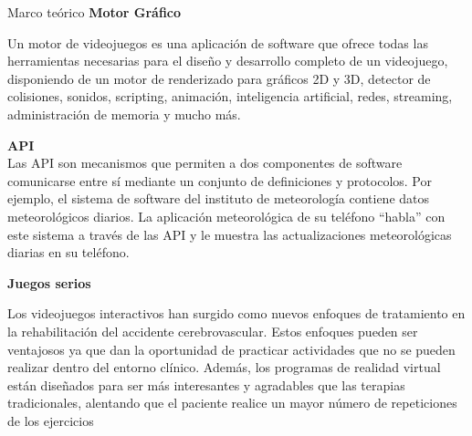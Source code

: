 \begin{thesischapter}{1} {Marco teórico}
    \vspace{10pt}
    \textbf{Motor Gráfico}

    \vspace{2pt}
    Un motor de videojuegos es una aplicación de software que ofrece
    todas las herramientas necesarias para el diseño y desarrollo completo de un videojuego, disponiendo
    de un motor de renderizado para gráficos 2D y 3D, detector de colisiones, sonidos, scripting,
    animación, inteligencia artificial, redes, streaming, administración de memoria y mucho más.~\cite{arce2011desarrollo} 
    
    \vspace{10pt}
    \textbf{API}\\
    Las API son mecanismos que permiten a dos componentes de software comunicarse entre sí mediante un conjunto de 
    definiciones y protocolos. Por ejemplo, el sistema de software del instituto de meteorología contiene datos meteorológicos 
    diarios. La aplicación meteorológica de su teléfono “habla” con este sistema a través de las API y le muestra las actualizaciones 
    meteorológicas diarias en su teléfono.~\cite{amazon}
    
    \vspace{10pt}
    \textbf{Juegos serios}

    \vspace{2pt}
    Los videojuegos interactivos han surgido como nuevos enfoques de tratamiento en
    la rehabilitación del accidente cerebrovascular. Estos enfoques pueden ser
    ventajosos ya que dan la oportunidad de practicar actividades que no se pueden
    realizar dentro del entorno clínico. Además, los programas de realidad virtual están
    diseñados para ser más interesantes y agradables que las terapias tradicionales,
    alentando que el paciente realice un mayor número de repeticiones de los ejercicios~\cite{laver2018virtual,alfageme2002aprendiendo}



\end{thesischapter}
